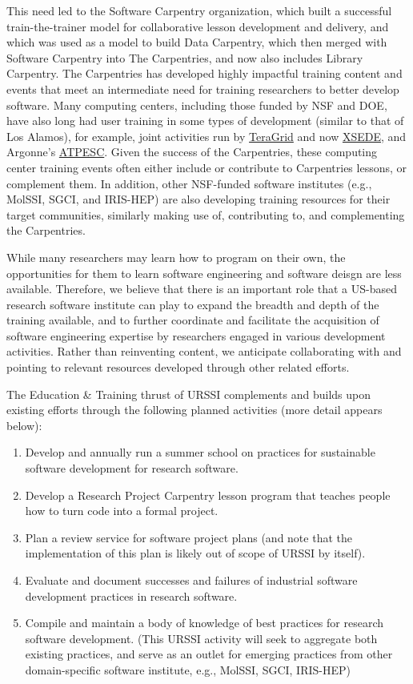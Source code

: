 \documentclass[
]{book}
\begin{document}
This need led to the Software Carpentry organization, which built a successful train-the-trainer
model for collaborative lesson development and delivery, and which was used as a model
to build Data Carpentry, which then merged with Software Carpentry into The Carpentries,
and now also includes Library Carpentry. The Carpentries has developed highly impactful
training content and events that meet an intermediate need for training researchers to
better develop software. Many computing centers, including those funded by NSF and DOE,
have also long had user training in some types of development (similar to that of Los
Alamos), for example, joint activities run by
\href{https://www.xsede.org/wwwteragrid/archive/web/eot/workshops.html}{TeraGrid} and now
\href{https://www.xsede.org/for-users/training}{XSEDE}, and Argonne's
\href{https://extremecomputingtraining.anl.gov}{ATPESC}. Given the success of the Carpentries,
these computing center training events often either include or contribute to Carpentries
lessons, or complement them. In addition, other NSF-funded software institutes (e.g.,
MolSSI, SGCI, and IRIS-HEP) are also developing training resources for their target
communities, similarly making use of, contributing to, and complementing the Carpentries.

While many researchers may learn how to program on their own, the opportunities for them
to learn software engineering and software deisgn are less available. Therefore, we believe
that there is an important role that a US-based research software institute
can play to expand the breadth and depth of the training available, and to further
coordinate and facilitate the acquisition of software engineering expertise by researchers
engaged in various development activities. Rather than reinventing content, we anticipate
collaborating with and pointing to relevant resources developed through other related efforts.

The Education \& Training thrust of URSSI complements and builds upon existing efforts through
the following planned activities (more detail appears below):

\begin{enumerate}
\def\labelenumi{\arabic{enumi}.}
\item
  Develop and annually run a summer school on practices for sustainable software development
  for research software.
\item
  Develop a Research Project Carpentry lesson program that teaches people how to turn code
  into a formal project.
\item
  Plan a review service for software project plans (and note that the implementation of this
  plan is likely out of scope of URSSI by itself).
\item
  Evaluate and document successes and failures of industrial software development practices
  in research software.
\item
  Compile and maintain a body of knowledge of best practices for research software development.
  (This URSSI activity will seek to aggregate both existing practices, and serve as an outlet
  for emerging practices from other domain-specific software institute, e.g., MolSSI, SGCI, IRIS-HEP)
\end{enumerate}
\end{document}
